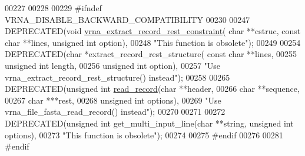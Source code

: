 \begin{DoxyCode}
00227 
00228 
00229 \textcolor{preprocessor}{#ifndef VRNA\_DISABLE\_BACKWARD\_COMPATIBILITY}
00230 
00247 DEPRECATED(\textcolor{keywordtype}{void} \hyperlink{group__file__utils_ga55a9ae6dfeecc1b3f0c2acf6fa796c15}{vrna\_extract\_record\_rest\_constraint}( \textcolor{keywordtype}{char} **cstruc, \textcolor{keyword}{
      const} \textcolor{keywordtype}{char} **lines, \textcolor{keywordtype}{unsigned} \textcolor{keywordtype}{int} option),
00248           \textcolor{stringliteral}{"This function is obsolete"});
00249 
00254 DEPRECATED(\textcolor{keywordtype}{char} *extract\_record\_rest\_structure( \textcolor{keyword}{const} \textcolor{keywordtype}{char} **lines,
00255                                                 \textcolor{keywordtype}{unsigned} \textcolor{keywordtype}{int} length,
00256                                                 \textcolor{keywordtype}{unsigned} \textcolor{keywordtype}{int} option),
00257           \textcolor{stringliteral}{"Use vrna\_extract\_record\_rest\_structure() instead"});
00258 
00265 DEPRECATED(\textcolor{keywordtype}{unsigned} \textcolor{keywordtype}{int} \hyperlink{group__file__utils_gafd194a69af9d92b5b0412a7627ac1595}{read\_record}(\textcolor{keywordtype}{char} **header,
00266                                     \textcolor{keywordtype}{char} **sequence,
00267                                     \textcolor{keywordtype}{char}  ***rest,
00268                                     \textcolor{keywordtype}{unsigned} \textcolor{keywordtype}{int} options),
00269           \textcolor{stringliteral}{"Use vrna\_file\_fasta\_read\_record() instead"});
00270 
00271 
00272 DEPRECATED(\textcolor{keywordtype}{unsigned} \textcolor{keywordtype}{int} get\_multi\_input\_line(\textcolor{keywordtype}{char} **\textcolor{keywordtype}{string}, \textcolor{keywordtype}{unsigned} \textcolor{keywordtype}{int} options),
00273           \textcolor{stringliteral}{"This function is obsolete"});
00274 
00275 \textcolor{preprocessor}{#endif}
00276 
00281 \textcolor{preprocessor}{#endif}
\end{DoxyCode}

